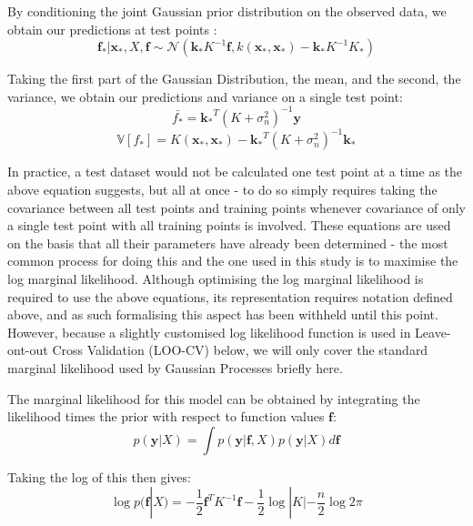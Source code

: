By conditioning the joint Gaussian prior distribution on the observed data, we obtain our predictions at test points :
\begin{equation}
    \mathbf{f_*} | \mathbf{x_*}, X, \mathbf{f} \sim \mathcal{N}( \mathbf{k_*} K^{-1} \mathbf{f},  
    k(\mathbf{x_*, x_*}) - \mathbf{k_*} K^{-1} K_*)
\end{equation}

Taking the first part of the Gaussian Distribution, the mean, and the second, the variance, we obtain our predictions and variance on a single test point:
\begin{equation}
    \bar{f_*} = \mathbf{k_*}^T(K+\sigma_n^2)^{-1} \mathbf{y}
\end{equation}
\begin{equation}
    \mathbb{V}[f_*] = K(\mathbf{x_*},\mathbf{x_*}) - \mathbf{k_*}^T (K+\sigma^2_n)^{-1}\mathbf{k_*}
\end{equation}

In practice, a test dataset would not be calculated one test point at a time as the above equation suggests, but all at once - to do so simply requires taking the covariance between all test points and training points whenever covariance of only a single test point with all training points is involved. These equations are used on the basis that all their parameters have already been determined - the most common process for doing this and the one used in this study is to maximise the log marginal likelihood. Although optimising the log marginal likelihood is required to use the above equations, its representation requires notation defined above, and as such formalising this aspect has been withheld until this point. However, because a slightly customised log likelihood function is used in Leave-ont-out Cross Validation (LOO-CV) below, we will only cover the standard marginal likelihood used by Gaussian Processes briefly here.

The marginal likelihood for this model can be obtained by integrating the likelihood times the prior with respect to function values $\mathbf{f}$:
\begin{equation}
    p(\mathbf{y}|X) = \int p(\mathbf{y|f}, X)p(\mathbf{y}|X)d\mathbf{f}
\end{equation}

Taking the log of this then gives:
\begin{equation}
    \log p(\mathbf{f}|X) = -\frac{1}{2} \mathbf{f}^T K^{-1} \mathbf{f} - \frac{1}{2} \log|K| - \frac{n}{2} \log 2\pi
\end{equation}

